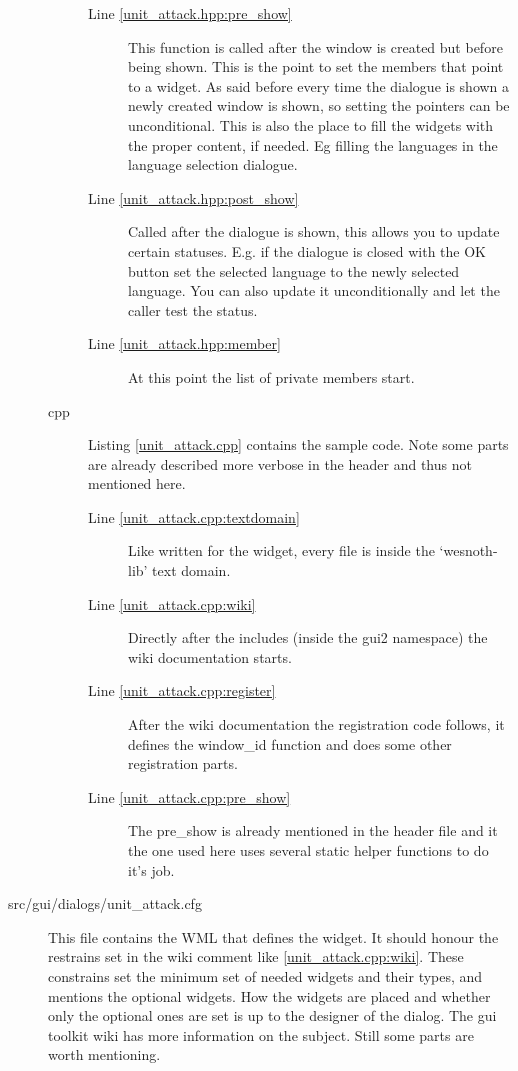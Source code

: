 \begin{description}
\begin{description}
\begin{description}
	\item[Line \ref{unit_attack.hpp:pre_show}]
		This function is called after the window is created but before being
shown. This is the point to set the members that point to a widget. As said
before every time the dialogue is shown a newly created window is shown, so
setting the pointers can be unconditional. This is also the place to fill the
widgets with the proper content, if needed. Eg filling the languages in the
language selection dialogue.

	\item[Line \ref{unit_attack.hpp:post_show}]
		Called after the dialogue is shown, this allows you to update certain
statuses. E.g. if the dialogue is closed with the OK button set the selected
language to the newly selected language. You can also update it unconditionally
and let the caller test the status.

	\item[Line \ref{unit_attack.hpp:member}]
		At this point the list of private members start.

	\end{description}

\item[cpp] Listing \ref{unit_attack.cpp} contains the sample code. Note some
parts are already described more verbose in the header and thus not mentioned
here.
	\begin{description}
	\item[Line \ref{unit_attack.cpp:textdomain}]
		Like written for the widget, every file is inside the `wesnoth-lib' text
domain.

	\item[Line \ref{unit_attack.cpp:wiki}]
		Directly after the includes (inside the gui2 namespace) the wiki
documentation starts.


	\item[Line \ref{unit_attack.cpp:register}]
		After the wiki documentation the registration code follows, it defines
the window\_id function and does some other registration parts.

	\item[Line \ref{unit_attack.cpp:pre_show}]
		The pre\_show is already mentioned in the header file and it the one
used here uses several static helper functions to do it's job.

	\end{description}

\end{description}

\item[src/gui/dialogs/unit\_attack.cfg]
	This file contains the WML that defines the widget. It should honour the
restrains set in the wiki comment like \ref{unit_attack.cpp:wiki}. These
constrains set the minimum set of needed widgets and their types, and mentions
the optional widgets. How the widgets are placed and whether only the optional
ones are set is up to the designer of the dialog. The gui toolkit wiki has more
information on the subject. Still some parts are worth mentioning.


\end{description}
